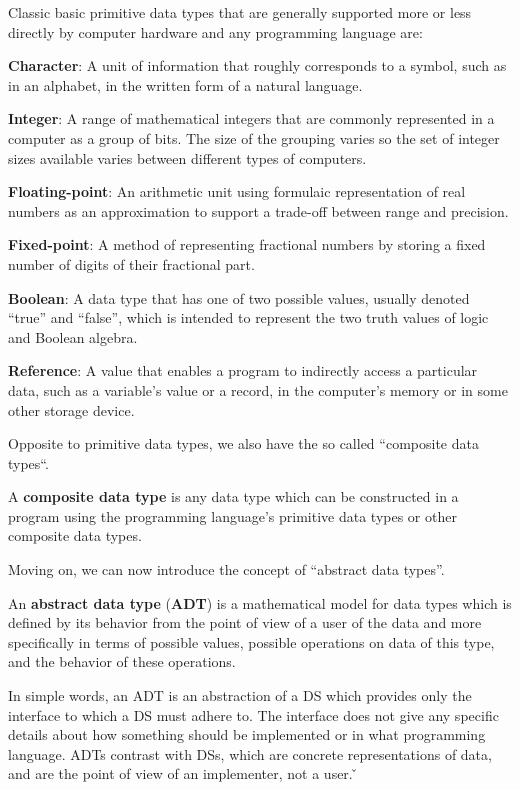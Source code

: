 Classic basic primitive data types that are generally supported more or less directly by computer hardware and any
programming language are:
\bit
\item \textbf{Character}: A unit of information that roughly corresponds to a symbol, such as in an alphabet, in the
written form of a natural language.
\item \textbf{Integer}: A range of mathematical integers that are commonly represented in a computer as a group of bits.
The size of the grouping varies so the set of integer sizes available varies between different types of computers.
\item \textbf{Floating-point}: An arithmetic unit using formulaic representation of real numbers as an approximation
to support a trade-off between range and precision.
\item \textbf{Fixed-point}: A method of representing fractional numbers by storing a fixed number of digits of their
fractional part.
\item \textbf{Boolean}: A data type that has one of two possible values, usually denoted ``true'' and ``false'', which
is intended to represent the two truth values of logic and Boolean algebra.
\item \textbf{Reference}: A value that enables a program to indirectly access a particular data, such as a variable's
value or a record, in the computer's memory or in some other storage device.
\eit

Opposite to primitive data types, we also have the so called ``composite data types``.

A \textbf{composite data type} is any data type which can be constructed in a program using the programming language's
primitive data types or other composite data types.
\ed

Moving on, we can now introduce the concept of ``abstract data types''.

An \textbf{abstract data type} (\textbf{ADT}) is a mathematical model for data types which is defined by its behavior
from the point of view of a user of the data and more specifically in terms of possible values, possible operations on
data of this type, and the behavior of these operations.
\ed

In simple words, an ADT is an abstraction of a DS which provides only the interface to which a DS must adhere to. The
interface does not give any specific details about how something should be implemented or in what programming
language. ADTs contrast with DSs, which are concrete representations of data, and are the point of view of an
implementer, not a user. \v

